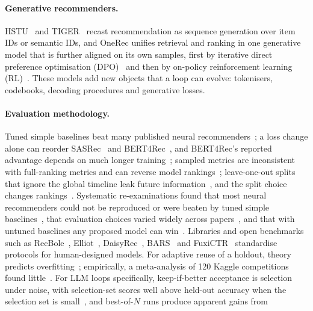 \documentclass[sigconf,nonacm]{acmart}
\begin{document}
\paragraph{Generative recommenders.} HSTU~\cite{zhai2024hstu} and TIGER~\cite{rajput2023tiger} recast recommendation
as sequence generation over item IDs or semantic IDs, and OneRec unifies retrieval and ranking in one generative model
that is further aligned on its own samples, first by iterative direct preference optimisation (DPO)~\cite{deng2025onerec} and then by on-policy
reinforcement learning (RL)~\cite{zhou2025onerectech,zhou2025openonerec}. These models add new objects that a loop can evolve: tokenisers, codebooks,
decoding procedures and generative losses.

\paragraph{Evaluation methodology.} Tuned simple baselines beat many published neural
recommenders~\cite{dacrema2019progress,rendle2020ncf}; a loss change alone can reorder SASRec~\cite{kang2018sasrec} and
BERT4Rec~\cite{sun2019bert4rec,klenitskiy2023dross}, and BERT4Rec's reported advantage depends on much longer
training~\cite{petrov2022bert4rec}; sampled metrics are inconsistent with full-ranking metrics and
can reverse model rankings~\cite{rendle2019sampled,krichene2020sampled,hidasi2023flaws}; leave-one-out splits that
ignore the global timeline leak future information~\cite{ji2020leakage,hidasi2023flaws}, and the split choice changes
rankings~\cite{meng2020splitting}. Systematic re-examinations found that most neural recommenders could not be reproduced or were beaten by tuned
simple baselines~\cite{dacrema2021troubling}, that evaluation choices varied widely across papers~\cite{sun2020rigorous},
and that with untuned baselines any proposed model can win~\cite{shehzad2023everyone}. Libraries and open benchmarks such as RecBole~\cite{zhao2021recbole}, Elliot~\cite{anelli2021elliot},
DaisyRec~\cite{sun2022daisyrec}, BARS~\cite{zhu2022bars} and FuxiCTR~\cite{zhu2021fuxictr} standardise protocols for
human-designed models. For adaptive reuse of a holdout, theory predicts overfitting~\cite{dwork2015reusable,
blum2015ladder}; empirically, a meta-analysis of 120 Kaggle competitions found little~\cite{roelofs2019metaanalysis}. For LLM
loops specifically, keep-if-better acceptance is selection under noise, with selection-set scores well above held-out
accuracy when the selection set is small~\cite{hu2026winnerscurse}, and best-of-$N$ runs produce apparent gains from
\end{document}

